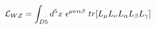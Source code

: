 \begin{equation}
{\cal{L}}_{WZ}= \int_{D5} d^5x~\epsilon^{\mu\nu\alpha\beta}~tr[L_\mu L_\nu L_\alpha L_\beta L_\gamma] 
\end{equation}

